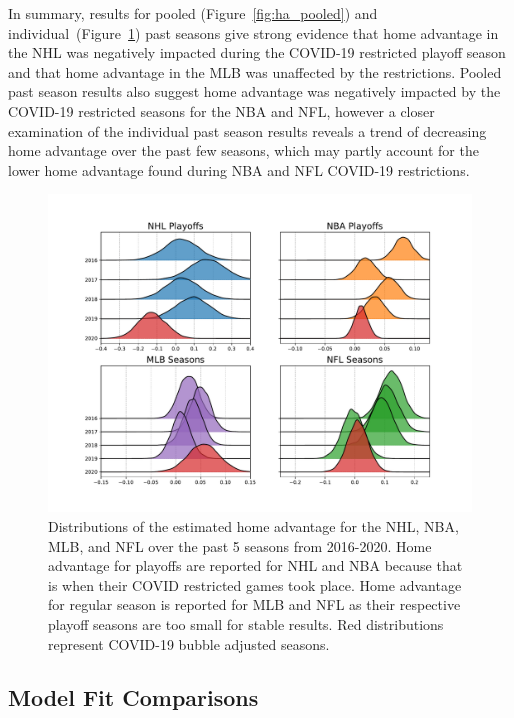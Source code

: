 In summary, results for pooled (Figure~\mbox{\ref{fig:ha_pooled}}) and individual~(Figure~\mbox{\ref{fig:ha_main}}) past seasons give strong evidence that home advantage in the NHL was negatively impacted during the COVID-19 restricted playoff season and that home advantage in the MLB was unaffected by the restrictions. Pooled past season results also suggest home advantage was negatively impacted by the COVID-19 restricted seasons for the NBA and NFL, however a closer examination of the individual past season results reveals a trend of decreasing home advantage over the past few seasons, which may partly account for the lower home advantage found during NBA and NFL COVID-19 restrictions.

\begin{figure}
	\centering
	\includegraphics[width=\textwidth]{figures/Figure_2.pdf}
	\caption{Distributions of the estimated home advantage for the NHL, NBA, MLB, and NFL over the past 5 seasons from 2016-2020. Home advantage for playoffs are reported for NHL and NBA because that is when their COVID restricted games took place. Home advantage for regular season is reported for MLB and NFL as their respective playoff seasons are too small for stable results. Red distributions represent COVID-19 bubble adjusted seasons.}
	\label{fig:ha_main}
\end{figure}

\subsection*{Model Fit Comparisons}


